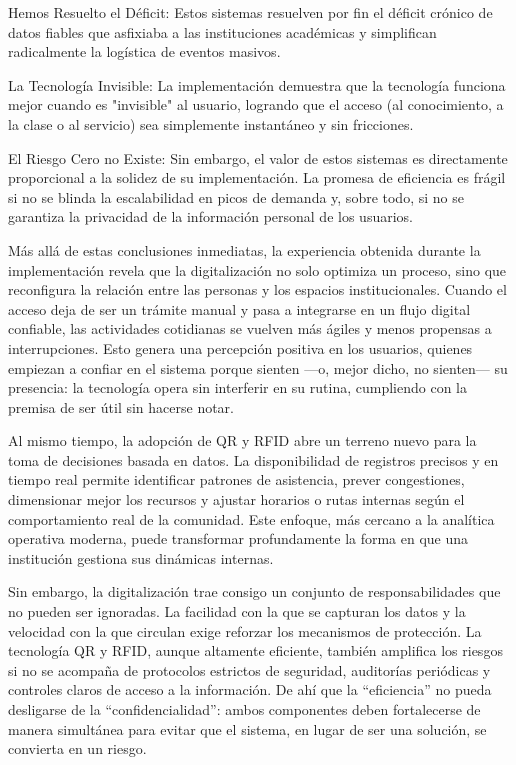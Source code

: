 Hemos Resuelto el Déficit: Estos sistemas resuelven por fin el déficit crónico de datos fiables que asfixiaba a las instituciones académicas y simplifican radicalmente la logística de eventos masivos.

La Tecnología Invisible: La implementación demuestra que la tecnología funciona mejor cuando es "invisible" al usuario, logrando que el acceso (al conocimiento, a la clase o al servicio) sea simplemente instantáneo y sin fricciones.

El Riesgo Cero no Existe: Sin embargo, el valor de estos sistemas es directamente proporcional a la solidez de su implementación. La promesa de eficiencia es frágil si no se blinda la escalabilidad en picos de demanda y, sobre todo, si no se garantiza la privacidad de la información personal de los usuarios.

Más allá de estas conclusiones inmediatas, la experiencia obtenida durante la implementación revela que la digitalización no solo optimiza un proceso, sino que reconfigura la relación entre las personas y los espacios institucionales. Cuando el acceso deja de ser un trámite manual y pasa a integrarse en un flujo digital confiable, las actividades cotidianas se vuelven más ágiles y menos propensas a interrupciones. Esto genera una percepción positiva en los usuarios, quienes empiezan a confiar en el sistema porque sienten —o, mejor dicho, no sienten— su presencia: la tecnología opera sin interferir en su rutina, cumpliendo con la premisa de ser útil sin hacerse notar.

Al mismo tiempo, la adopción de QR y RFID abre un terreno nuevo para la toma de decisiones basada en datos. La disponibilidad de registros precisos y en tiempo real permite identificar patrones de asistencia, prever congestiones, dimensionar mejor los recursos y ajustar horarios o rutas internas según el comportamiento real de la comunidad. Este enfoque, más cercano a la analítica operativa moderna, puede transformar profundamente la forma en que una institución gestiona sus dinámicas internas.

Sin embargo, la digitalización trae consigo un conjunto de responsabilidades que no pueden ser ignoradas. La facilidad con la que se capturan los datos y la velocidad con la que circulan exige reforzar los mecanismos de protección. La tecnología QR y RFID, aunque altamente eficiente, también amplifica los riesgos si no se acompaña de protocolos estrictos de seguridad, auditorías periódicas y controles claros de acceso a la información. De ahí que la “eficiencia” no pueda desligarse de la “confidencialidad”: ambos componentes deben fortalecerse de manera simultánea para evitar que el sistema, en lugar de ser una solución, se convierta en un riesgo.

